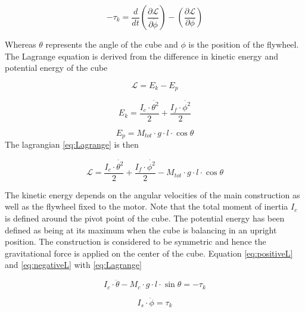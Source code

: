 \documentclass[a4paper,11pt]{kth-mag}
\begin{document}
\begin{equation} \label{eq:negativeL}
-\tau_k=\frac{d}{dt}\left(\frac{\partial \mathcal{L}}{\partial \dot{\phi}}\right)-\left(\frac{\partial \mathcal{L}}{\partial \phi}\right)
\end{equation}

Whereas $\theta$ represents the angle of the cube and $\phi$ is the position of the flywheel. \\
The Lagrange equation is derived from the difference in kinetic energy and potential energy of the cube

\begin{equation} \label{eq:Lagrange}
\mathcal{L} = E_k - E_p
\end{equation}

\begin{equation} \label{eq:kinetic energy}
E_k = \frac{I_c \cdot \dot{\theta^2}}{2} + \frac{I_f \cdot \dot{\phi^2} }{2}
\end{equation}

\begin{equation} \label{eq:potential energy}
E_p = M_{tot} \cdot g \cdot l \cdot \cos \theta
\end{equation}
The lagrangian \eqref{eq:Lagrange} is then

\begin{equation}
\mathcal{L} = \frac{I_c \cdot \dot{\theta^2}}{2} + \frac{I_f \cdot \dot{\phi^2} }{2} - M_{tot} \cdot g \cdot l \cdot \cos \theta 
\end{equation}

The kinetic energy depends on the angular velocities of the main construction as well as the flywheel fixed to the motor. Note that the total moment of inertia $I_c$ is defined around the pivot point of the cube. The potential energy has been defined as being at its maximum when the cube is balancing in an upright position. The construction is considered to be symmetric and hence the gravitational force is applied on the center of the cube.
Equation \eqref{eq:positiveL} and \eqref{eq:negativeL} with \eqref{eq:Lagrange}

\begin{equation} \label{eq:negativeL2}
I_c \cdot \ddot{\theta} - M_c \cdot g \cdot l \cdot \sin \theta   = -\tau_k
\end{equation}

\begin{equation} \label{eq:postiveL2}
I_s \cdot \ddot{\phi} = \tau_k
\end{equation}
\end{document}
